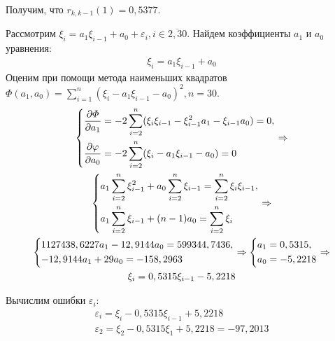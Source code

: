 \documentclass[utf8, a4paper, 14pt, russian, oneside]{book}
\begin{document}
Получим, что $r_{k, k-1}(1) = 0,5377$.


Рассмотрим $\xi_i = a_1 \xi_{i-1} + a_0 + \varepsilon_i, i \in \overline{2, 30}$. Найдем коэффициенты $a_1$ и $a_0$ уравнения:
\begin{gather*}
    \xi_i = a_1 \xi_{i-1} + a_0
\end{gather*}
Оценим при помощи метода наименьших квадратов $\varPhi(a_1, a_0) = \sum\limits_{i=1}^n (\xi_i - a_1\xi_{i-1} - a_0)^2, n = 30$.
\begin{gather*}
    \begin{dcases}
         \frac{\partial \varPhi}{\partial a_1}  = -2 \sum\limits_{i=2}^n(\xi_i \xi_{i-1} - \xi_{i-1}^2 a_1 - \xi_{i-1}a_0) = 0, \\
         \frac{\partial \varphi}{\partial a_0}  = -2 \sum\limits_{i=2}^n (\xi_i - a_1\xi_{i-1} - a_0) = 0
    \end{dcases}
    \Rightarrow \\
    \begin{dcases}
        a_1 \sum\limits_{i=2}^n\xi_{i-1}^2 + a_0\sum\limits_{i=2}^n\xi_{i-1} = \sum\limits_{i=2}^n \xi_i \xi_{i-1}, \\
        a_1 \sum\limits_{i=2}^n \xi_{i-1} + (n-1)a_0 = \sum\limits_{i=2}^n\xi_i
    \end{dcases}
    \Rightarrow \\
    \begin{dcases}
        1127438,6227 a_1 -12,9144 a_0 = 599344,7436, \\
        -12,9144a_1 + 29a_0 = -158,2963
    \end{dcases}
    \Rightarrow
    \begin{dcases}
        a_1 = 0,5315, \\
        a_0 = -5,2218
    \end{dcases}
    \Rightarrow \\
    \xi_i = 0,5315 \xi_{i-1} -5,2218
\end{gather*}

Вычислим ошибки $\varepsilon_i$:
\begin{gather*}
    \varepsilon_i = \xi_i - 0,5315\xi_{i-1} + 5,2218 \\
    \varepsilon_2 = \xi_2 - 0,5315\xi_{1} + 5,2218 = -97,2013
\end{gather*}
\end{document}
